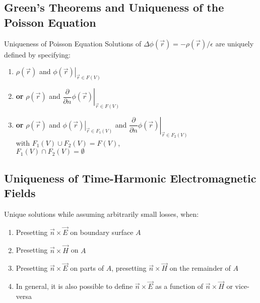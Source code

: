 \subsection{Green's Theorems and Uniqueness of the Poisson Equation}
\begin{info}{Uniqueness of Poisson Equation}
  Solutions of $\Delta\phi(\vec{r}) = -\rho(\vec{r})/\epsilon$ are uniquely defined by specifying:
  \begin{enumerate}
    \item $\rho(\vec{r})$ and $\left.\phi(\vec{r})\right|_{\vec{r}\in F(V)}$
    \item \textbf{or} $\rho(\vec{r})$ and $\left.\dfrac{\partial}{\partial n}\phi(\vec{r})\right|_{\vec{r}\in F(V)}$
    \item \textbf{or} $\rho(\vec{r})$ and $\left.\phi(\vec{r})\right|_{\vec{r}\in F_{1}(V)}$ and $\left.\dfrac{\partial}{\partial n}\phi(\vec{r})\right|_{\vec{r}\in F_{2}(V)}$\\
          with $F_{1}(V) \cup F_{2}(V) = F(V)$,\\
          $F_{1}(V) \cap F_{2}(V) = \emptyset$
  \end{enumerate}
\end{info}

\subsection{Uniqueness of Time-Harmonic Electromagnetic Fields}
Unique solutions while assuming arbitrarily small losses, when:
\begin{enumerate}
\item Presetting $\vec{n}\times\vec{E}$ on boundary surface $A$
\item Presetting $\vec{n}\times\vec{H}$ on $A$
\item Presetting $\vec{n}\times\vec{E}$ on parts of $A$, presetting $\vec{n}\times\vec{H}$ on the remainder of $A$
\item In general, it is also possible to define $\vec{n}\times\vec{E}$ as a function of $\vec{n}\times\vec{H}$ or vice-versa
\end{enumerate}

